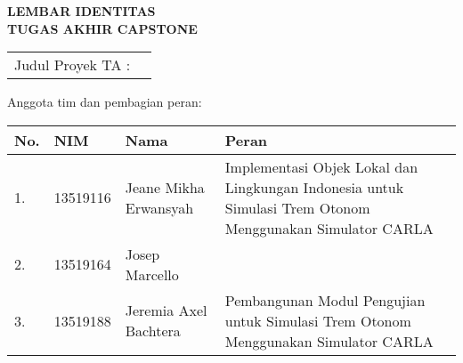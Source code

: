 \clearpage
\pagestyle{empty}

\begin{center}
	\smallskip

	\Large \bfseries \MakeUppercase{
		Lembar Identitas \\
		Tugas Akhir Capstone
	}
	\vspace{0.5cm}

	\raggedright
	\begin{table}[h!]
		\large \bfseries
		\begin{tabular}{p{} p{}}
			Judul Proyek TA : & \capstoneTitle
		\end{tabular}
	\end{table}

	\normalsize \normalfont

	Anggota tim dan pembagian peran:

	\begin{table}[h!]
		\begin{tabular}{|p{} | p{} | p{} | p{}|}
			\hline
			\textbf{No.} & \textbf{NIM} & \textbf{Nama}         & \textbf{Peran}                                                                                           \\
			\hline
			1.           & 13519116     & Jeane Mikha Erwansyah & Implementasi Objek Lokal dan Lingkungan Indonesia untuk Simulasi Trem Otonom Menggunakan Simulator CARLA \\
			\hline
			2.           & 13519164     & Josep Marcello        & \thetitle                                                                                                \\
			\hline
			3.           & 13519188     & Jeremia Axel Bachtera & Pembangunan Modul Pengujian untuk Simulasi Trem Otonom Menggunakan Simulator CARLA                       \\
			\hline
		\end{tabular}
	\end{table}

	\vfill
	\pembimbingTtd

\end{center}
\clearpage
